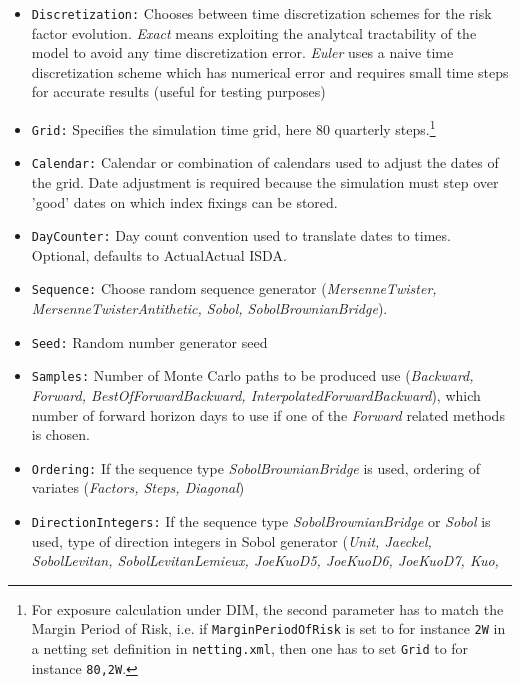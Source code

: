 \documentclass[12pt, a4paper]{article}
\begin{document}
{{\begin{itemize}
\item {\tt Discretization:} Chooses between time discretization schemes for the risk factor evolution. {\em Exact} means
exploiting the analytcal tractability of the model to avoid any time discretization error. {\em Euler} uses a naive time
discretization scheme which has numerical error and requires small time steps for accurate results (useful for testing
purposes)
\item {\tt Grid:} Specifies the simulation time grid, here 80 quarterly steps.\footnote{For exposure calculation under DIM, the second parameter has to match the Margin Period of Risk, i.e. if {\tt MarginPeriodOfRisk} is set to for instance {\tt 2W} in a netting set definition in {\tt netting.xml}, then one has to set {\tt Grid} to for instance {\tt 80,2W}.}
\item {\tt Calendar:} Calendar or combination of calendars used to adjust the dates of the grid. Date adjustment is
required because the simulation must step over 'good' dates on which index fixings can be stored.
\item {\tt DayCounter:} Day count convention used to translate dates to times. Optional, defaults to ActualActual ISDA.
\item {\tt Sequence:} Choose random sequence generator ({\em MersenneTwister, MersenneTwisterAntithetic, Sobol,
SobolBrownianBridge}).
\item {\tt Seed:} Random number generator seed
\item {\tt Samples:} Number of Monte Carlo paths to be produced
use ({\em Backward, Forward, BestOfForwardBackward, InterpolatedForwardBackward}), which number of forward horizon days
to use if one of the {\em Forward } related methods is chosen.
\item {\tt Ordering:} If the sequence type {\em SobolBrownianBridge} is used, ordering of variates ({\em Factors, Steps,
    Diagonal})
\item {\tt DirectionIntegers:} If the sequence type {\em SobolBrownianBridge} or {\em Sobol} is used, type of direction
  integers in Sobol generator ({\em Unit, Jaeckel, SobolLevitan, SobolLevitanLemieux, JoeKuoD5, JoeKuoD6, JoeKuoD7, Kuo,
}
\end{itemize}}}
\end{document}
